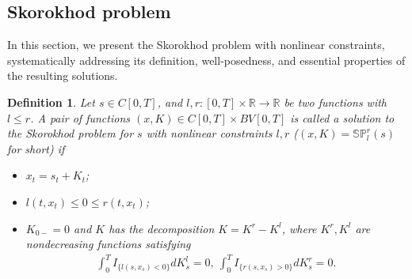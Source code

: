 \documentclass[10pt]{article}%
\numberwithin{equation}{section}
\newtheorem{definition}[theorem]{Definition}
\def \E{\mathbf{E}}
\begin{document}

\subsection{Skorokhod problem}
In this section, we present the Skorokhod problem with nonlinear constraints, systematically addressing its definition, well-posedness, and essential properties of the resulting solutions. 
\begin{definition}\label{def1}
Let $s\in C[0,T]$,  and $l,r:[0,T] \times \mathbb{R}\rightarrow \mathbb{R}$ be two functions with $l\leq r$.  A pair of functions $(x,K)\in C[0,T]\times BV[0,T]$ is called a solution to the  Skorokhod problem for $s$ with nonlinear constraints $l,r$ ($(x,K)=\mathbb{SP}_l^r(s)$ for short) if %
\begin{itemize}
\item[(i)] $x_t=s_t+K_t$;
\item[(ii)] $l(t,x_t)\leq 0\leq r(t,x_t)$;
\item[(iii)]  $K_{0-}=0$ and $K$ has the decomposition $K=K^r-K^l$, where $K^r,K^l$ are nondecreasing functions satisfying  
\begin{align}
\int_0^{T} I_{\{l(s,x_s)<0\}}dK^l_s=0, \  \int_0^{T} I_{\{r(s,x_s)>0\}}dK^r_s=0.
\end{align}
\end{itemize}
\end{definition}
\end{document}
